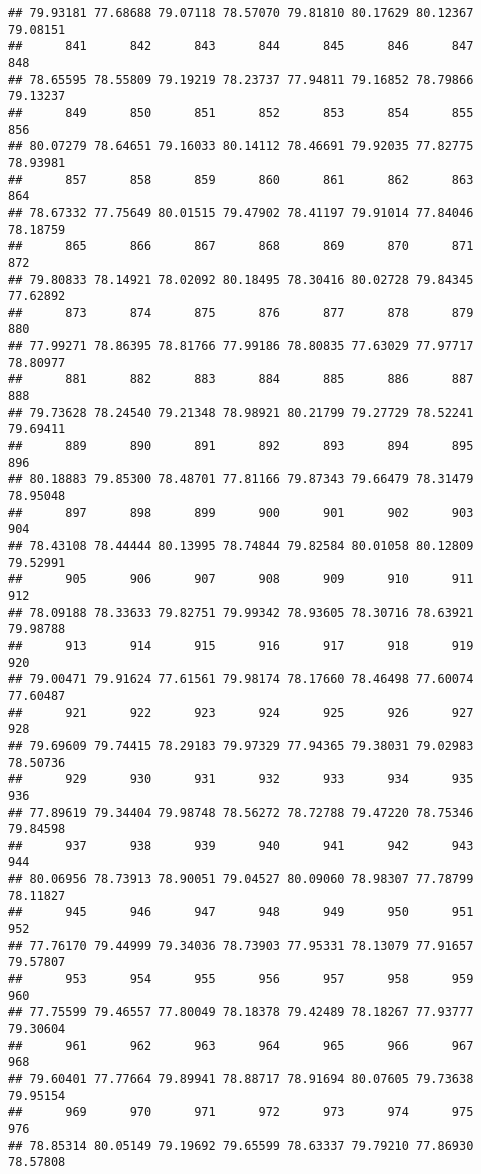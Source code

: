 \documentclass[
]{article}
\begin{document}
\begin{verbatim}
## 79.93181 77.68688 79.07118 78.57070 79.81810 80.17629 80.12367 79.08151 
##      841      842      843      844      845      846      847      848 
## 78.65595 78.55809 79.19219 78.23737 77.94811 79.16852 78.79866 79.13237 
##      849      850      851      852      853      854      855      856 
## 80.07279 78.64651 79.16033 80.14112 78.46691 79.92035 77.82775 78.93981 
##      857      858      859      860      861      862      863      864 
## 78.67332 77.75649 80.01515 79.47902 78.41197 79.91014 77.84046 78.18759 
##      865      866      867      868      869      870      871      872 
## 79.80833 78.14921 78.02092 80.18495 78.30416 80.02728 79.84345 77.62892 
##      873      874      875      876      877      878      879      880 
## 77.99271 78.86395 78.81766 77.99186 78.80835 77.63029 77.97717 78.80977 
##      881      882      883      884      885      886      887      888 
## 79.73628 78.24540 79.21348 78.98921 80.21799 79.27729 78.52241 79.69411 
##      889      890      891      892      893      894      895      896 
## 80.18883 79.85300 78.48701 77.81166 79.87343 79.66479 78.31479 78.95048 
##      897      898      899      900      901      902      903      904 
## 78.43108 78.44444 80.13995 78.74844 79.82584 80.01058 80.12809 79.52991 
##      905      906      907      908      909      910      911      912 
## 78.09188 78.33633 79.82751 79.99342 78.93605 78.30716 78.63921 79.98788 
##      913      914      915      916      917      918      919      920 
## 79.00471 79.91624 77.61561 79.98174 78.17660 78.46498 77.60074 77.60487 
##      921      922      923      924      925      926      927      928 
## 79.69609 79.74415 78.29183 79.97329 77.94365 79.38031 79.02983 78.50736 
##      929      930      931      932      933      934      935      936 
## 77.89619 79.34404 79.98748 78.56272 78.72788 79.47220 78.75346 79.84598 
##      937      938      939      940      941      942      943      944 
## 80.06956 78.73913 78.90051 79.04527 80.09060 78.98307 77.78799 78.11827 
##      945      946      947      948      949      950      951      952 
## 77.76170 79.44999 79.34036 78.73903 77.95331 78.13079 77.91657 79.57807 
##      953      954      955      956      957      958      959      960 
## 77.75599 79.46557 77.80049 78.18378 79.42489 78.18267 77.93777 79.30604 
##      961      962      963      964      965      966      967      968 
## 79.60401 77.77664 79.89941 78.88717 78.91694 80.07605 79.73638 79.95154 
##      969      970      971      972      973      974      975      976 
## 78.85314 80.05149 79.19692 79.65599 78.63337 79.79210 77.86930 78.57808 

\end{verbatim}
\end{document}
